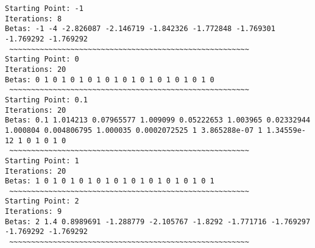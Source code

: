 \documentclass[
  letterpaper,
  DIV=11,
  numbers=noendperiod]{scrartcl}
\newenvironment{Shaded}{\begin{snugshade}}{\end{snugshade}}
\newcommand{\CommentTok}[1]{\textcolor[rgb]{0.37,0.37,0.37}{#1}}
\newcommand{\ControlFlowTok}[1]{\textcolor[rgb]{0.00,0.23,0.31}{\textbf{#1}}}
\newcommand{\FunctionTok}[1]{\textcolor[rgb]{0.28,0.35,0.67}{#1}}
\newcommand{\NormalTok}[1]{\textcolor[rgb]{0.00,0.23,0.31}{#1}}
\newcommand{\OtherTok}[1]{\textcolor[rgb]{0.00,0.23,0.31}{#1}}
\newcommand{\SpecialCharTok}[1]{\textcolor[rgb]{0.37,0.37,0.37}{#1}}
\newcommand{\StringTok}[1]{\textcolor[rgb]{0.13,0.47,0.30}{#1}}
\begin{document}
\begin{Shaded}
\end{Shaded}

\begin{verbatim}
Starting Point: -1 
Iterations: 8 
Betas: -1 -4 -2.826087 -2.146719 -1.842326 -1.772848 -1.769301 -1.769292 -1.769292 
 ~~~~~~~~~~~~~~~~~~~~~~~~~~~~~~~~~~~~~~~~~~~~~~~~~~~~~~~ 
Starting Point: 0 
Iterations: 20 
Betas: 0 1 0 1 0 1 0 1 0 1 0 1 0 1 0 1 0 1 0 1 0 
 ~~~~~~~~~~~~~~~~~~~~~~~~~~~~~~~~~~~~~~~~~~~~~~~~~~~~~~~ 
Starting Point: 0.1 
Iterations: 20 
Betas: 0.1 1.014213 0.07965577 1.009099 0.05222653 1.003965 0.02332944 1.000804 0.004806795 1.000035 0.0002072525 1 3.865288e-07 1 1.34559e-12 1 0 1 0 1 0 
 ~~~~~~~~~~~~~~~~~~~~~~~~~~~~~~~~~~~~~~~~~~~~~~~~~~~~~~~ 
Starting Point: 1 
Iterations: 20 
Betas: 1 0 1 0 1 0 1 0 1 0 1 0 1 0 1 0 1 0 1 0 1 
 ~~~~~~~~~~~~~~~~~~~~~~~~~~~~~~~~~~~~~~~~~~~~~~~~~~~~~~~ 
Starting Point: 2 
Iterations: 9 
Betas: 2 1.4 0.8989691 -1.288779 -2.105767 -1.8292 -1.771716 -1.769297 -1.769292 -1.769292 
 ~~~~~~~~~~~~~~~~~~~~~~~~~~~~~~~~~~~~~~~~~~~~~~~~~~~~~~~ 
\end{verbatim}
\end{document}
